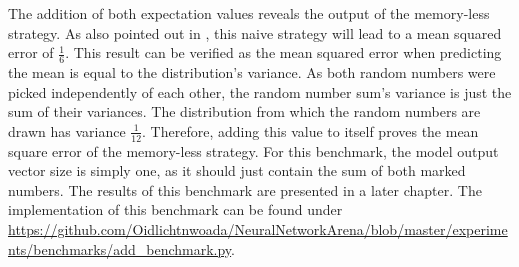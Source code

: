 \documentclass[draft,final]{vutinfth} %
\begin{document}
    The addition of both expectation values reveals the output of the memory-less strategy.
    As also pointed out in \cite[p. 6]{UnitaryRNNs}, this naive strategy will lead to a mean squared error of $\frac{1}{6}$.
    This result can be verified as the mean squared error when predicting the mean is equal to the distribution’s variance.
    As both random numbers were picked independently of each other, the random number sum's variance is just the sum of their variances.
    The distribution from which the random numbers are drawn has variance $\frac{1}{12}$.
    Therefore, adding this value to itself proves the mean square error of the memory-less strategy.
    For this benchmark, the model output vector size is simply one, as it should just contain the sum of both marked numbers.
    The results of this benchmark are presented in a later chapter.
    The implementation of this benchmark can be found under \url{https://github.com/Oidlichtnwoada/NeuralNetworkArena/blob/master/experiments/benchmarks/add_benchmark.py}.
\end{document}

